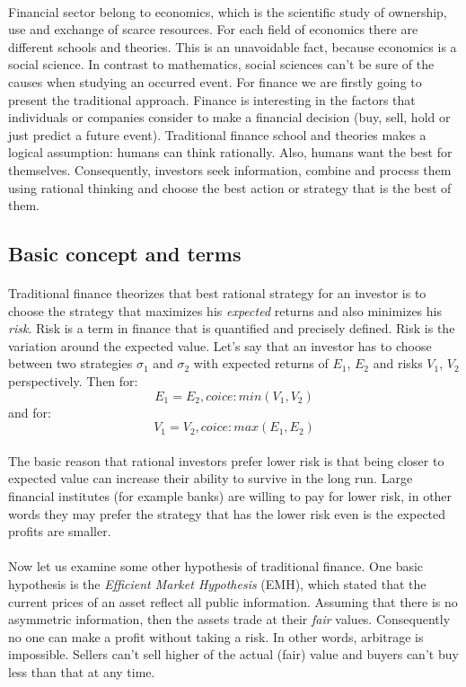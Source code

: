 \documentclass{article}
\begin{document}
\paragraph{ }
Financial sector belong to economics, which is the scientific study of ownership, use and exchange of scarce resources. For each field of economics there are different schools and theories. This is an unavoidable fact, because economics is a social science. In contrast to mathematics, social sciences can't be sure of the causes when studying an occurred event. For finance we are firstly going to present the traditional approach. Finance is interesting in the factors that individuals or companies consider to make a financial decision (buy, sell, hold or just predict a future event). Traditional finance school and theories makes a logical assumption: humans can think rationally. Also, humans want the best for themselves. Consequently, investors seek information, combine and process them using rational thinking and choose the best action or strategy that is the best of them.

\subsection{Basic concept and terms}
\paragraph{ }
Traditional finance theorizes that best rational strategy for an investor is to choose the strategy that maximizes his \emph{expected} returns and also minimizes his \emph{risk}. Risk is a term in finance that is quantified and precisely defined. Risk is the variation around the expected value. Let's say that an investor has to choose between two strategies $\sigma_{1}$ and $\sigma_{2}$ with expected returns of $E_{1}$, $E_{2}$ and risks $V_{1}$, $V_{2}$ perspectively. Then for:
$$ E_{1} = E_{2} , coice: min(V_{1} , V_{2})  $$ and for:
$$ V_{1} = V_{2} , coice: max(E_{1} , E_{2})  $$
\paragraph{ }
The basic reason that rational investors prefer lower risk is that being closer to expected value can increase their ability to survive in the long run. Large financial institutes (for example banks) are willing to pay for lower risk, in other words they may prefer the strategy that has the lower risk even is the expected profits are smaller.
\paragraph{ }
Now let us examine some other hypothesis of traditional finance. One basic hypothesis is the \emph{Efficient Market Hypothesis} (EMH), which stated that the current prices of an asset reflect all public information. Assuming that there is no asymmetric information, then the assets trade at their \emph{fair} values. Consequently no one can make a profit without taking a risk. In other words, arbitrage is impossible. Sellers can't sell higher of the actual (fair) value and buyers can't buy less than that at any time.
\end{document}
